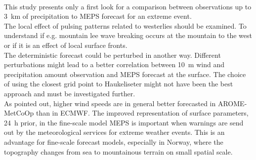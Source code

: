 \\
This study presents only a first look for a comparison between observations up to \SI{3}{\km} of precipitation to MEPS forecast for an extreme event. 
\\
The local effect of pulsing patterns related to westerlies should be examined. To understand if e.g. mountain lee wave breaking occurs at the mountain to the west or if it is an effect of local surface fronts. 
\\
The deterministic forecast could be perturbed in another way. 
Different perturbations might lead to a better correlation between \SI{10}{\metre} wind and precipitation amount observation and MEPS forecast at the surface. %
The choice of using the closest grid point to Haukeliseter might not have been the best approach and must be investigated further. %
\\
As \cite{muller_arome-metcoop:_2017} pointed out, higher wind speeds are in general better forecasted in AROME-MetCoOp than in ECMWF. %
The improved representation of surface parameters, \SI{24}{\hour} prior, in the fine-scale model MEPS is important when warnings are send out by the meteorological services for extreme weather events. This is an advantage for fine-scale forecast models, especially in Norway, where the topography changes from sea to mountainous terrain on small spatial scale.





